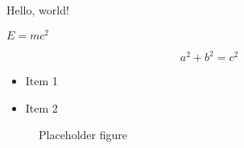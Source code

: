 

Hello, world!

$E=mc^2$

\begin{equation}
    a^2 + b^2 = c^2
\end{equation}

\begin{itemize}
    \item Item 1
    \item Item 2
\end{itemize}

\begin{figure}[h]
    \centering
    \caption{Placeholder figure}
    \label{fig:placeholder}
\end{figure}

